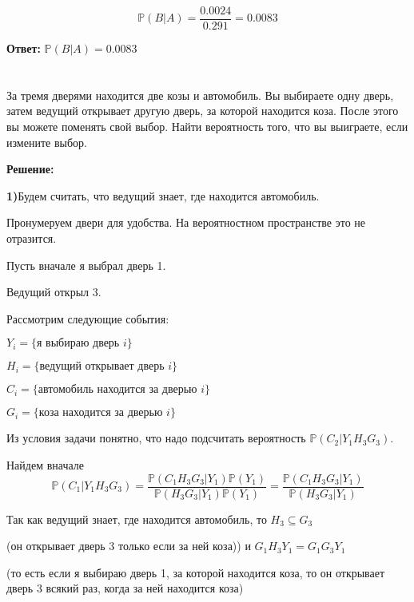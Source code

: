 \documentclass[a4paper,12pt]{article}
\newcommand{\bb}{\mathbb}
\begin{document}
$$\bb P(B|A) = \dfrac{0.0024}{0.291} = 0.0083$$

\vspace{\baselineskip}


\textbf{Ответ:} $\bb P(B|A) = 0.0083$

\section{}

За тремя дверями находится две козы и автомобиль. Вы выбираете одну дверь,
затем ведущий открывает другую дверь, за которой находится коза. После этого
вы можете поменять свой выбор. Найти вероятность того, что вы выиграете, если
измените выбор.

\vspace{\baselineskip}

\textbf{Решение:}

\textbf{1)}Будем считать, что ведущий знает, где находится автомобиль.

\vspace{\baselineskip}

Пронумеруем двери для удобства. На вероятностном пространстве это не отразится.

Пусть вначале я выбрал дверь 1.

Ведущий открыл 3.

Рассмотрим следующие события:

$Y_i = \{\text{я выбираю дверь }i\} $

$H_i = \{\text{ведущий открывает дверь }i\}$

$C_i = \{\text{автомобиль находится за дверью }i\} $

$G_i = \{\text{коза находится за дверью }i\} $

\vspace{\baselineskip}


Из условия задачи понятно, что надо подсчитать вероятность $\bb P(C_2|Y_1H_3G_3)$.

Найдем вначале $$\bb P(C_1|Y_1H_3G_3) = \dfrac{\bb P(C_1H_3G_3|Y_1)\bb P(Y_1)}{\bb P(H_3G_3|Y_1)\bb P(Y_1)} = \dfrac{\bb P(C_1H_3G_3|Y_1)}{\bb P(H_3G_3|Y_1)}$$

Так как ведущий знает, где находится автомобиль, то $H_3 \subseteq G_3$

(он открывает дверь 3 только если за ней коза))
и $ G_1H_3Y_1 = G_1G_3Y_1$

(то есть если я выбираю дверь 1, за которой находится коза, то он открывает дверь 3 всякий раз, когда за ней находится коза)
\end{document}
